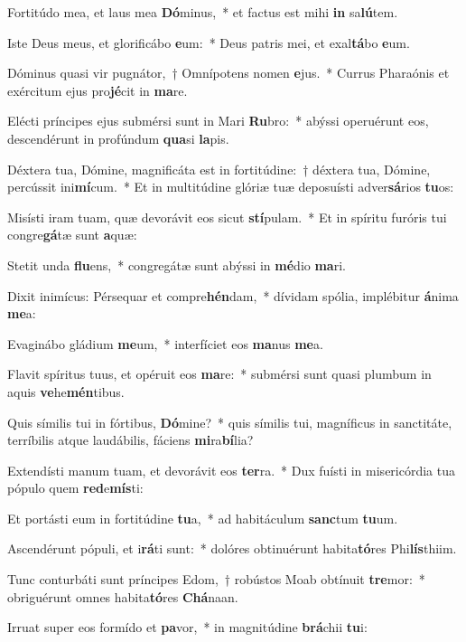 \item Fortitúdo mea, et laus mea \textbf{Dó}minus,~* et factus est mihi \textbf{in} sa\textbf{lú}tem.
\item Iste Deus meus, et glorificábo \textbf{e}um:~* Deus patris mei, et exal\textbf{tá}bo \textbf{e}um.
\item Dóminus quasi vir pugnátor,~† Omnípotens nomen \textbf{e}jus.~* Currus Pharaónis et exércitum ejus pro\textbf{jé}cit in \textbf{ma}re.
\item Elécti príncipes ejus submérsi sunt in Mari \textbf{Ru}bro:~* abýssi operuérunt eos, descendérunt in profúndum \textbf{qua}si \textbf{la}pis.
\item Déxtera tua, Dómine, magnificáta est in fortitúdine:~† déxtera tua, Dómine, percússit ini\textbf{mí}cum.~* Et in multitúdine glóriæ tuæ deposuísti adver\textbf{sá}rios \textbf{tu}os:
\item Misísti iram tuam, quæ devorávit eos sicut \textbf{stí}pulam.~* Et in spíritu furóris tui congre\textbf{gá}tæ sunt \textbf{a}quæ:
\item Stetit unda \textbf{flu}ens,~* congregátæ sunt abýssi in \textbf{mé}dio \textbf{ma}ri.
\item Dixit inimícus: Pérsequar et compre\textbf{hén}dam,~* dívidam spólia, implébitur \textbf{á}nima \textbf{me}a:
\item Evaginábo gládium \textbf{me}um,~* interfíciet eos \textbf{ma}nus \textbf{me}a.
\item Flavit spíritus tuus, et opéruit eos \textbf{ma}re:~* submérsi sunt quasi plumbum in aquis \textbf{ve}he\textbf{mén}tibus.
\item Quis símilis tui in fórtibus, \textbf{Dó}mine?~* quis símilis tui, magníficus in sanctitáte, terríbilis atque laudábilis, fáciens \textbf{mi}ra\textbf{bí}lia?
\item Extendísti manum tuam, et devorávit eos \textbf{ter}ra.~* Dux fuísti in misericórdia tua pópulo quem \textbf{red}e\textbf{mís}ti:
\item Et portásti eum in fortitúdine \textbf{tu}a,~* ad habitáculum \textbf{sanc}tum \textbf{tu}um.
\item Ascendérunt pópuli, et i\textbf{rá}ti sunt:~* dolóres obtinuérunt habita\textbf{tó}res Phi\textbf{lís}thiim.
\item Tunc conturbáti sunt príncipes Edom,~† robústos Moab obtínuit \textbf{tre}mor:~* obriguérunt omnes habita\textbf{tó}res \textbf{Chá}naan.
\item Irruat super eos formído et \textbf{pa}vor,~* in magnitúdine \textbf{brá}chii \textbf{tu}i:
